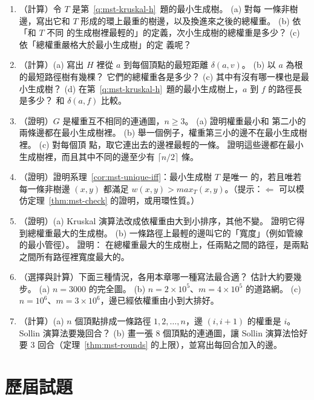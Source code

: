 \begin{enumerate}
\item \label{q:mst-second-h}（計算）令 $T$ 是第~\ref{q:mst-kruskal-h}~題的最小生成樹。 (a) 對每
一條非樹邊，寫出它和 $T$ 形成的環上最重的樹邊，以及換進來之後的總權重。 (b) 依「和 $T$ 不同
的生成樹裡最輕的」的定義，次小生成樹的總權重是多少？ (c) 依「總權重嚴格大於最小生成樹」的定
義呢？

\item \label{q:mst-spt-h}（計算）(a) 寫出 $H$ 裡從 $a$ 到每個頂點的最短距離 $\delta(a, v)$。 (b)
以 $a$ 為根的最短路徑樹有幾棵？ 它們的總權重各是多少？ (c) 其中有沒有哪一棵也是最小生成樹？
(d) 在第~\ref{q:mst-kruskal-h}~題的最小生成樹上，$a$ 到 $f$ 的路徑長是多少？ 和 $\delta(a, f)$
比較。

\item \label{q:mst-two-light}（證明）$G$ 是權重互不相同的連通圖，$n \ge 3$。 (a) 證明權重最小和
第二小的兩條邊都在最小生成樹裡。 (b) 舉一個例子，權重第三小的邊不在最小生成樹裡。 (c) 對每個頂
點，取它連出去的邊裡最輕的一條。 證明這些邊都在最小生成樹裡，而且其中不同的邊至少有 $\lceil
n/2 \rceil$ 條。

\item \label{q:mst-unique-iff}（證明）證明系理~\ref{cor:mst-unique-iff}：最小生成樹 $T$ 是唯一
的，若且唯若每一條非樹邊 $(x, y)$ 都滿足 $w(x, y) > \mathit{max}_T(x, y)$。（提示：$\Leftarrow$
可以模仿定理~\ref{thm:mst-check} 的證明，或用環性質。）

\item \label{q:mst-max}（證明）(a) Kruskal 演算法改成依權重由大到小排序，其他不變。 證明它得
到總權重最大的生成樹。 (b) 一條路徑上最輕的邊叫它的「寬度」（例如管線的最小管徑）。 證明：
在總權重最大的生成樹上，任兩點之間的路徑，是兩點之間所有路徑裡寬度最大的。

\item \label{q:mst-dense}（選擇與計算）下面三種情況，各用本章哪一種寫法最合適？ 估計大約要幾
步。 (a) $n = 3000$ 的完全圖。 (b) $n = 2 \times 10^5$、$m = 4 \times 10^5$ 的道路網。 (c) $n =
10^6$、$m = 3 \times 10^6$，邊已經依權重由小到大排好。

\item \label{q:mst-rounds}（計算）(a) $n$ 個頂點排成一條路徑 $1, 2, \ldots, n$，邊 $(i, i + 1)$
的權重是 $i$。 Sollin 演算法要幾回合？ (b) 畫一張 $8$ 個頂點的連通圖，讓 Sollin 演算法恰好要
$3$ 回合（定理~\ref{thm:mst-rounds} 的上限），並寫出每回合加入的邊。
\end{enumerate}

\section{歷屆試題}
\label{sec:mst-pastexam}

